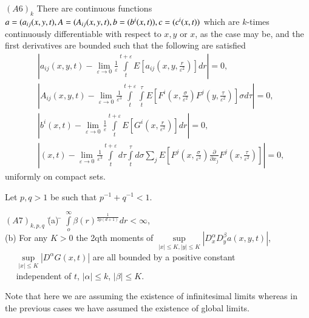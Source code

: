 \noindent
$(A6)_k$ There are continuous functions $a =(a_{ij}(x,y,t), A =
(A_{ij}(x,y,t),\break b = (b^i(x,t)), c= (c^i(x,t))$ which are $k$-times
continuously differentiable with respect to $x,y$ or $x$, as the case
may be, and the first derivatives are bounded such that the following
are satisfied  
\begin{align*}
  &|a_{ij}(x,y,t) - \lim_{\varepsilon \to 0} \frac{1}{\varepsilon}
  \int \limits^{t+ \varepsilon}_t
  E\left[a_{ij} \left(x,y,\frac{r}{\varepsilon^2}\right)\right] dr | = 0,\\ 
  & |A_{ij}(x,y,t) - \lim_{\varepsilon \to 0} \frac{1}{\varepsilon^3}
  \int \limits^{t+ \varepsilon}_t \int \limits^{\tau}_t E\left[F^i (x,
    \frac{\sigma}{\varepsilon^2}) F^j \left(y,
    \frac{\tau}{\varepsilon^2}\right)\right] 
  \sigma d \tau |=0,\\ 
  &| b^i (x,t) - \lim_{\varepsilon \to 0} \frac{1}{\varepsilon}\int
  \limits^{t+ \varepsilon}_t
  E\left[G^i\left(x,\frac{r}{\varepsilon^2}\right)\right] dr | =0,\\ 
  &|(x,t) -\lim_{\varepsilon \to 0} \frac{1}{\varepsilon^3}\int
  \limits^{t+ \varepsilon}_t d \tau \int \limits^{\tau}_t d \sigma
  \sum_j E \left[ F^j(x,\frac{\sigma}{\varepsilon^2})
    \frac{\partial}{\partial x_j} F^j\left(x,
    \frac{\tau}{\varepsilon^2}\right)\right]|  = 0, 
\end{align*}
uniformly on compact sets.

Let $p,q>1$ be such that $p^{-1} + q^{-1}<1$.

\noindent
\begin{tabbing}
$(A7)_{k,p,q}$ \=   (a)  \=  $\int \limits^{\infty}_o \beta
  (r)^{\frac{1}{2p(d+1)}} dr < \infty$,  \\
\> (b) \> For any $K>0$ the 2qth moments of $\sup\limits_{|x| \leq K, |y|\leq
  K}|D^{\alpha}_x D^{\beta}_y a(x,y,t)|$,\\
\> ~~ \>  $\sup\limits_{|x|\leq K} |D^{\alpha}
  G (x,t)|$ are all bounded by a positive constant\\
\> ~~ \>  independent of
  $t$, $|\alpha| \leq k$, $|\beta| \leq K$. 
\end{tabbing}\pageoriginale

\setcounter{remark}{3}
\begin{remark}\label{c3:rem3.10.4} %
  Note that here we are assuming the existence of infinitesimal limits
  whereas in the previous cases we have assumed the existence of
  global limits. 
\end{remark}

